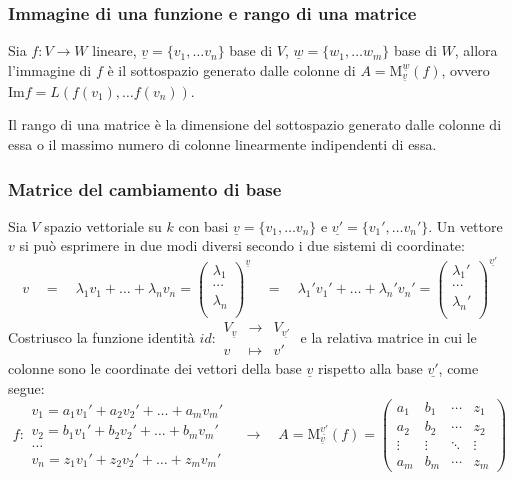 \documentclass[a4paper]{article}
\newcommand\f[4]{\begin{smallmatrix} {#1} &\to &{#2} \\ {#3} &\mapsto &{#4} \end{smallmatrix}}
\newcommand\m[2]{\text{M}_{\underline{#1}}^{\underline{#2}}}
\newcommand\img{\text{Im}}		%
\begin{document}
\newpage

\subsubsection*{Immagine di una funzione e rango di una matrice}
Sia \(f:V \to W\) lineare, \(\underline{v} = \{v_1, \dots v_n\}\) base di \(V\), \(\underline{w} = \{w_1, \dots w_m\}\) base di \(W\),
allora l'immagine di \(f\) è il sottospazio generato dalle colonne di \(A = \m{v}{w}(f)\), ovvero \(\img f = L(f(v_1), \dots f(v_n))\).

Il rango di una matrice è la dimensione del sottospazio generato dalle colonne di essa o il massimo numero di colonne linearmente
indipendenti di essa.

\subsubsection*{Matrice del cambiamento di base}
Sia \(V\) spazio vettoriale su \(k\) con basi \(\underline{v} = \{v_1, \dots v_n\}\) e \(\underline{v'} = \{v_1', \dots v_n'\}\).
Un vettore \(v\) si può esprimere in due modi diversi secondo i due sistemi di coordinate:
\[v \quad = \quad \lambda_1 v_1 + \dots + \lambda_n v_n = \begin{pmatrix} \lambda_1 \\ \cdots \\ \lambda_n \\ \end{pmatrix}^{\underline{v}}
	\quad = \quad	\lambda_1' v_1' + \dots + \lambda_n' v_n' = \begin{pmatrix} \lambda_1' \\ \cdots \\ \lambda_n' \\ \end{pmatrix}^{\underline{v'}}\]
Costriusco la funzione identità \(id: \f{V_{\underline{v}}}{V_{\underline{v'}}}{v}{v'}\) e la relativa matrice in cui le colonne
sono le coordinate dei vettori della base \(\underline{v}\) rispetto alla base \(\underline{v'}\), come segue:
\[f: \begin{matrix}
	v_1 = a_1 v_1' + a_2 v_2' + \dots + a_m v_m' \\
	v_2 = b_1 v_1' + b_2 v_2' + \dots + b_m v_m' \\
	\dots \\
	v_n = z_1 v_1' + z_2 v_2' + \dots + z_m v_m'
\end{matrix} \quad \longrightarrow \quad A = \m{v}{v'}(f) = \left( \begin{matrix}
	a_1 & b_1 & \cdots & z_1 \\
	a_2 & b_2 & \cdots & z_2 \\
	\vdots & \vdots & \ddots & \vdots \\
	a_m & b_m & \cdots & z_m
\end{matrix} \right)\]
\end{document}
